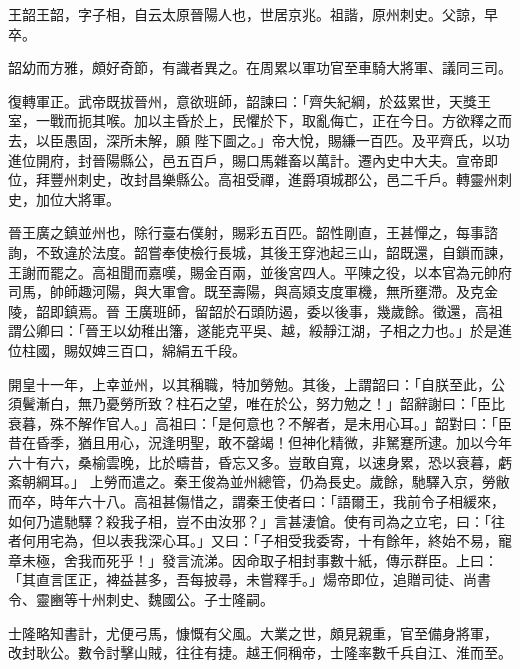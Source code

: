 
\begin{pinyinscope}

 王韶王韶，字子相，自云太原晉陽人也，世居京兆。祖諧，原州刺史。父諒，早卒。



 韶幼而方雅，頗好奇節，有識者異之。在周累以軍功官至車騎大將軍、議同三司。



 復轉軍正。武帝既拔晉州，意欲班師，韶諫曰：「齊失紀綱，於茲累世，天獎王室，一戰而扼其喉。加以主昏於上，民懼於下，取亂侮亡，正在今日。方欲釋之而去，以臣愚固，深所未解，願
 陛下圖之。」帝大悅，賜縑一百匹。及平齊氏，以功進位開府，封晉陽縣公，邑五百戶，賜口馬雜畜以萬計。遷內史中大夫。宣帝即位，拜豐州刺史，改封昌樂縣公。高祖受禪，進爵項城郡公，邑二千戶。轉靈州刺史，加位大將軍。



 晉王廣之鎮並州也，除行臺右僕射，賜彩五百匹。韶性剛直，王甚憚之，每事諮詢，不致違於法度。韶嘗奉使檢行長城，其後王穿池起三山，韶既還，自鎖而諫，王謝而罷之。高祖聞而嘉嘆，賜金百兩，並後宮四人。平陳之役，以本官為元帥府司馬，帥師趣河陽，與大軍會。既至壽陽，與高熲支度軍機，無所壅滯。及克金陵，韶即鎮焉。晉
 王廣班師，留韶於石頭防遏，委以後事，幾歲餘。徵還，高祖謂公卿曰：「晉王以幼稚出籓，遂能克平吳、越，綏靜江湖，子相之力也。」於是進位柱國，賜奴婢三百口，綿絹五千段。



 開皇十一年，上幸並州，以其稱職，特加勞勉。其後，上謂韶曰：「自朕至此，公須鬢漸白，無乃憂勞所致？柱石之望，唯在於公，努力勉之！」韶辭謝曰：「臣比衰暮，殊不解作官人。」高祖曰：「是何意也？不解者，是未用心耳。」韶對曰：「臣昔在昏季，猶且用心，況逢明聖，敢不罄竭！但神化精微，非駑蹇所逮。加以今年六十有六，桑榆雲晚，比於疇昔，昏忘又多。豈敢自寬，以速身累，恐以衰暮，虧紊朝綱耳。」
 上勞而遣之。秦王俊為並州總管，仍為長史。歲餘，馳驛入京，勞敝而卒，時年六十八。高祖甚傷惜之，謂秦王使者曰：「語爾王，我前令子相緩來，如何乃遣馳驛？殺我子相，豈不由汝邪？」言甚淒愴。使有司為之立宅，曰：「往者何用宅為，但以表我深心耳。」又曰：「子相受我委寄，十有餘年，終始不易，寵章未極，舍我而死乎！」發言流涕。因命取子相封事數十紙，傳示群臣。上曰：「其直言匡正，裨益甚多，吾每披尋，未嘗釋手。」煬帝即位，追贈司徒、尚書令、靈豳等十州刺史、魏國公。子士隆嗣。



 士隆略知書計，尤便弓馬，慷慨有父風。大業之世，頗見親重，官至備身將軍，
 改封耿公。數令討擊山賊，往往有捷。越王侗稱帝，士隆率數千兵自江、淮而至。




\end{pinyinscope}
